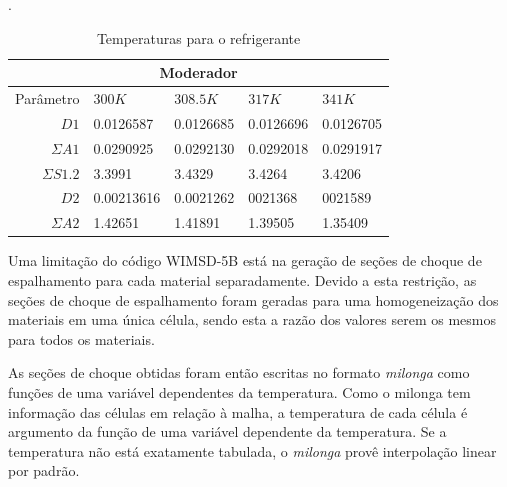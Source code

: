 \begin{table}[htb]
  \caption[Temperaturas para o refrigerante.]{Temperaturas para o refrigerante}.
  \label{tab:temp-coolant}
  \begin{tabular}{r l l l l}
    \multicolumn{5}{c}{Moderador} \\
    \hline
    Parâmetro & $300K$ & $308.5K$ & $317K$ & $341K$ \\
    \hline
    $D1$ & 0.0126587 & 0.0126685 & 0.0126696 & 0.0126705\\
    $\Sigma A1$ & 0.0290925 & 0.0292130 & 0.0292018 & 0.0291917\\
    $\Sigma S1.2$ & 3.3991 & 3.4329 & 3.4264 & 3.4206\\
    \hline
    $D2$ & 0.00213616 & 0.0021262 & 0021368 & 0021589\\
    $\Sigma A2$ & 1.42651 & 1.41891 & 1.39505 & 1.35409\\
    \hline
  \end{tabular}
\end{table}

Uma limitação do código WIMSD-5B está na geração de seções de choque de espalhamento
para cada material separadamente. Devido a esta restrição, as seções de choque de
espalhamento foram geradas para uma homogeneização dos materiais em uma única célula,
sendo esta a razão dos valores serem os mesmos para todos os materiais.


%
%
As seções de choque obtidas foram então escritas no formato \textit{milonga} como
funções de uma variável dependentes da temperatura. Como o milonga tem informação
das células em relação à malha, a temperatura de cada célula é argumento da
função de uma variável dependente da temperatura. Se a temperatura não está
exatamente tabulada, o \textit{milonga} provê interpolação linear por padrão.

